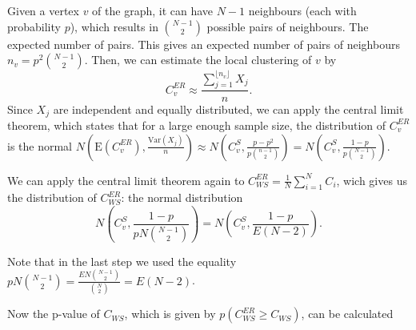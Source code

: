 \documentclass[paper=a4, fontsize=11pt]{scrartcl} %
\newcommand{\E}{\mathrm{E}}
\newcommand{\Var}{\mathrm{Var}}
\begin{document}
Given a vertex $v$ of the graph, it can have $N-1$ neighbours (each with probability $p$), which results in $\binom{N-1}{2}$ possible pairs of neighbours. The expected number of pairs. This gives an expected number of pairs of neighbours $n_v=p^2\binom{N-1}{2}$.  Then, we can estimate the local clustering of $v$ by $$C_v^{ER}\approx \frac{\sum_{j=1}^{\lfloor n_v\rfloor}X_j}{n}.$$
Since $X_j$ are independent and equally distributed, we can apply the central limit theorem, which states that for a large enough sample size, the distribution of $C_v^{ER}$ is the normal $N(\E(C_v^{ER}),\frac{\Var(X_j)}{n})\approx N(C_v^S,\frac{p-p^2}{p\binom{n-1}{2}})=N(C_v^S,\frac{1-p}{p\binom{N-1}{2}})$. 

We can apply the central limit theorem again to $C_{WS}^{ER}=\frac{1}{N}\sum_{i=1}^NC_i$, wich gives us the distribution of $C_{WS}^{ER}$: the normal distribution $$N(C_v^S,\frac{1-p}{pN\binom{N-1}{2}})=N(C_v^S,\frac{1-p}{E(N-2)}).$$


Note that in the last step we used the equality $pN\binom{N-1}{2}=\frac{EN\binom{N-1}{2}}{\binom{N}{2}}=E(N-2)$.

Now the p-value of $C_{WS}$, which is given by $p(C_{WS}^{ER}\geq C_{WS})$, can be calculated
\end{document}
